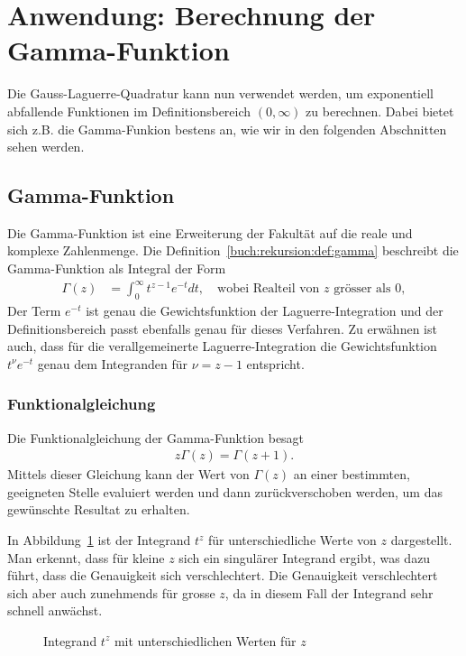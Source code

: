 %
%
%
\section{Anwendung: Berechnung der Gamma-Funktion
  \label{laguerre:section:quad-gamma}}
Die Gauss-Laguerre-Quadratur kann nun verwendet werden,
um exponentiell abfallende Funktionen im Definitionsbereich $(0, \infty)$ zu
berechnen.
Dabei bietet sich z.B. die Gamma-Funkion bestens an, wie wir in den folgenden
Abschnitten sehen werden.

\subsection{Gamma-Funktion}
Die Gamma-Funktion ist eine Erweiterung der Fakultät auf die reale und komplexe
Zahlenmenge.
Die Definition~\ref{buch:rekursion:def:gamma} beschreibt die Gamma-Funktion als
Integral der Form
\begin{align}
\Gamma(z)
 & =
\int_0^\infty t^{z-1} e^{-t} dt
,
\quad
\text{wobei Realteil von $z$ grösser als $0$}
,
\label{laguerre:gamma}
\end{align}
Der Term $e^{-t}$ ist genau die Gewichtsfunktion der Laguerre-Integration und
der Definitionsbereich passt ebenfalls genau für dieses Verfahren.
Zu erwähnen ist auch, dass für die verallgemeinerte Laguerre-Integration die
Gewichtsfunktion $t^\nu e^{-t}$ genau dem Integranden für $\nu=z-1$ entspricht.

\subsubsection{Funktionalgleichung}
Die Funktionalgleichung der Gamma-Funktion besagt
\begin{align}
z \Gamma(z) = \Gamma(z+1).
\label{laguerre:gamma_funktional}
\end{align}
Mittels dieser Gleichung kann der Wert von $\Gamma(z)$ an einer bestimmten,
geeigneten Stelle evaluiert werden und dann zurückverschoben werden,
um das gewünschte Resultat zu erhalten.

In Abbildung~\ref{laguerre:fig:integrand} ist der Integrand $t^z$ für
unterschiedliche Werte von $z$ dargestellt.
Man erkennt, dass für kleine $z$ sich ein singulärer Integrand ergibt,
was dazu führt, dass die Genauigkeit sich verschlechtert.
Die Genauigkeit verschlechtert sich aber auch zunehmends für grosse $z$,
da in diesem Fall der Integrand sehr schnell anwächst.
\begin{figure}
\centering
\scalebox{0.8}{}
\caption{Integrand $t^z$ mit unterschiedlichen Werten für $z$}
\label{laguerre:fig:integrand}
\end{figure}


